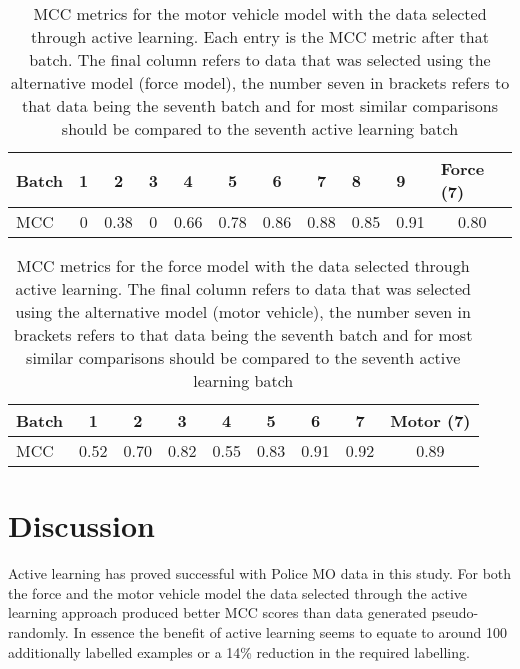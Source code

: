 \begin{table}[]
\centering
\begin{tabular}{@{}lcccccccccc@{}}
\toprule
Batch  & 1 & 2    & 3 & 4    & 5    & 6    & 7    & \multicolumn{1}{l}{8} & \multicolumn{1}{l}{9} & \multicolumn{1}{l}{Force (7)} \\ \midrule
MCC    & 0 & 0.38 & 0 & 0.66 & 0.78 & 0.86 & 0.88 & 0.85                  & 0.91                  & 0.80                             \\ \midrule
\end{tabular}
\caption{\label{tab:active_results_car} MCC metrics for the motor vehicle model with the data selected through active learning. Each entry is the MCC metric after that batch. The final column refers to data that was selected using the alternative model (force model), the number seven in brackets refers to that data being the seventh batch and for most similar comparisons should be compared to the seventh active learning batch}
\end{table}

\begin{table}[]
\centering
\begin{tabular}{@{}llllllllc@{}}
\toprule
Batch    & \multicolumn{1}{c}{1} & \multicolumn{1}{c}{2} & \multicolumn{1}{c}{3} & \multicolumn{1}{c}{4} & \multicolumn{1}{c}{5} & \multicolumn{1}{c}{6} & \multicolumn{1}{c}{7} & \multicolumn{1}{c}{Motor (7)} \\ \midrule
MCC    & 0.52                  & 0.70                  & 0.82                  & 0.55                  & 0.83                  & 0.91                  & 0.92   & 0.89                \\ \bottomrule
\end{tabular}
\caption{\label{tab:active_results_force} MCC metrics for the force model with the data selected through active learning. The final column refers to data that was selected using the alternative model (motor vehicle), the number seven in brackets refers to that data being the seventh batch and for most similar comparisons should be compared to the seventh  active learning batch}
\end{table}


\section{Discussion} Active learning has proved successful with Police MO data in this study. For both the force and the motor vehicle model the data selected through the active learning approach produced better MCC scores than data generated pseudo-randomly. In essence the benefit of active learning seems to equate to around 100 additionally labelled examples or a 14\% reduction in the required labelling.

